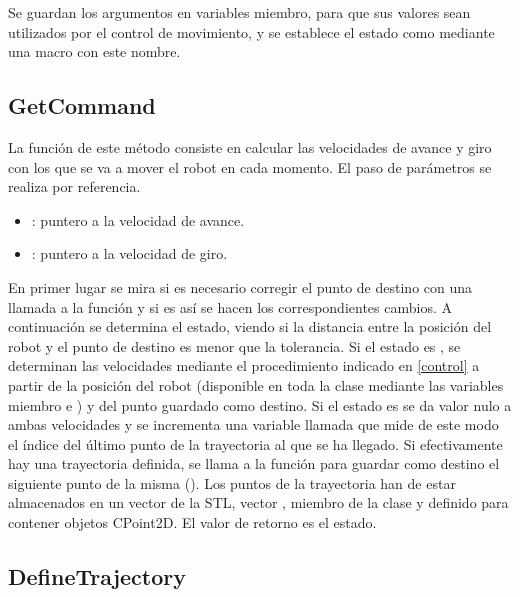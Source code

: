 \noindent
Se guardan los argumentos en variables miembro, para que sus valores sean utilizados por el control de movimiento, y se establece el estado como  mediante una macro con este nombre.

\subsection{GetCommand}

\noindent
{}

\noindent
La función de este método consiste en calcular las velocidades de avance y giro con los que se va a mover el robot en cada momento. El paso de parámetros se realiza por referencia.

\begin{itemize}
  \item {}: puntero a la velocidad de avance.
  \item {}: puntero a la velocidad de giro.
\end{itemize}

\noindent
En primer lugar se mira si es necesario corregir el punto de destino con una llamada a la función  y si es así se hacen los correspondientes cambios. A continuación se determina el estado, viendo si la distancia entre la posición del robot y el punto de destino es menor que la tolerancia.
Si el estado es , se determinan las velocidades mediante el procedimiento indicado en \ref{control} a partir de la posición del robot (disponible en toda la clase mediante las variables miembro  e ) y del punto guardado como destino.
Si el estado es  se da valor nulo a ambas velocidades y se incrementa una variable llamada  que mide de este modo el índice del último punto de la trayectoria al que se ha llegado. Si efectivamente hay una trayectoria definida, se llama a la función  para guardar como destino el siguiente punto de la misma (). Los puntos de la trayectoria han de estar almacenados en un vector de la STL, vector , miembro de la clase y definido para contener objetos CPoint2D.
\noindent
El valor de retorno es el estado.

\subsection{DefineTrajectory}

\noindent
{}

